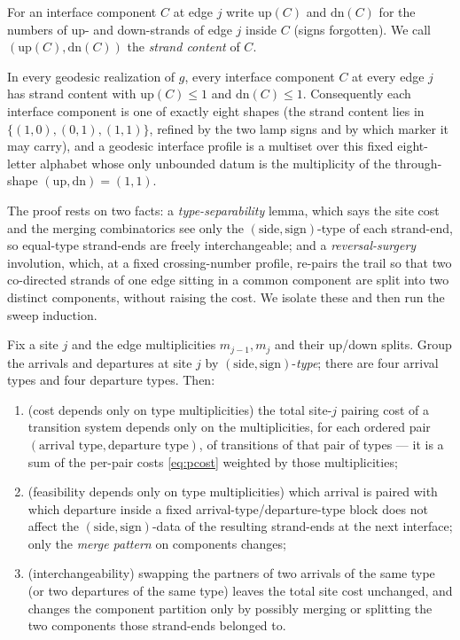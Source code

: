 For an interface component $C$ at edge $j$ write
$\mathrm{up}(C)$ and $\mathrm{dn}(C)$ for the numbers of up- and
down-strands of edge $j$ inside $C$ (signs forgotten).  We call
$(\mathrm{up}(C),\mathrm{dn}(C))$ the \emph{strand content} of $C$.

\begin{lemma}
\label{lem:strand-bound}
In every geodesic realization of $g$, every interface component $C$ at every
edge $j$ has strand content with $\mathrm{up}(C)\le 1$ and
$\mathrm{dn}(C)\le 1$.  Consequently each interface component is one of
exactly eight shapes (the strand content lies in
$\{(1,0),(0,1),(1,1)\}$, refined by the two lamp signs and by which marker
it may carry), and a geodesic interface profile is a multiset over this
fixed eight-letter alphabet whose only unbounded datum is the multiplicity
of the through-shape $(\mathrm{up},\mathrm{dn})=(1,1)$.
\end{lemma}

The proof rests on two facts: a \emph{type-separability} lemma, which says
the site cost and the merging combinatorics see only the
$(\text{side},\text{sign})$-type of each strand-end, so equal-type
strand-ends are freely interchangeable; and a \emph{reversal-surgery}
involution, which, at a fixed crossing-number profile, re-pairs the trail so
that two co-directed strands of one edge sitting in a common component are
split into two distinct components, without raising the cost.  We isolate
these and then run the sweep induction.

\begin{lemma}
\label{lem:type-sep}
Fix a site $j$ and the edge multiplicities $m_{j-1},m_j$ and their
up/down splits.  Group the arrivals and departures at site $j$ by
$(\text{side},\text{sign})$-\emph{type}; there are four arrival types and
four departure types.  Then:
\begin{enumerate}[label=\textup{(\roman*)},itemsep=0.15em]
\item \textup{(cost depends only on type multiplicities)}
the total site-$j$ pairing cost of a transition system
depends only on the multiplicities, for each ordered pair
$(\text{arrival type},\text{departure type})$, of transitions of that pair
of types --- it is a sum of the per-pair costs \eqref{eq:pcost} weighted by
those multiplicities;
\item \textup{(feasibility depends only on type multiplicities)}
which arrival is paired with which departure inside a fixed
arrival-type/departure-type block does not affect the
$(\text{side},\text{sign})$-data of the resulting strand-ends at the next
interface; only the \emph{merge pattern} on components changes;
\item \textup{(interchangeability)}
swapping the partners of two arrivals of the same type
\textup{(}or two departures of the same type\textup{)} leaves the total
site cost unchanged, and changes the component partition only by possibly
merging or splitting the two components those strand-ends belonged to.
\end{enumerate}
\end{lemma}

